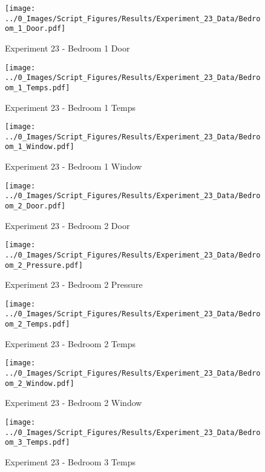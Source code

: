	\begin{figure}[H]
		\centering
		\texttt{[image: ../0\_Images/Script\_Figures/Results/Experiment\_23\_Data/Bedroom\_1\_Door.pdf]}
		\caption[]{Experiment 23 - Bedroom 1 Door}
	\end{figure}
 

	\begin{figure}[H]
		\centering
		\texttt{[image: ../0\_Images/Script\_Figures/Results/Experiment\_23\_Data/Bedroom\_1\_Temps.pdf]}
		\caption[]{Experiment 23 - Bedroom 1 Temps}
	\end{figure}
 
	\clearpage

	\begin{figure}[H]
		\centering
		\texttt{[image: ../0\_Images/Script\_Figures/Results/Experiment\_23\_Data/Bedroom\_1\_Window.pdf]}
		\caption[]{Experiment 23 - Bedroom 1 Window}
	\end{figure}
 

	\begin{figure}[H]
		\centering
		\texttt{[image: ../0\_Images/Script\_Figures/Results/Experiment\_23\_Data/Bedroom\_2\_Door.pdf]}
		\caption[]{Experiment 23 - Bedroom 2 Door}
	\end{figure}
 
	\clearpage

	\begin{figure}[H]
		\centering
		\texttt{[image: ../0\_Images/Script\_Figures/Results/Experiment\_23\_Data/Bedroom\_2\_Pressure.pdf]}
		\caption[]{Experiment 23 - Bedroom 2 Pressure}
	\end{figure}
 

	\begin{figure}[H]
		\centering
		\texttt{[image: ../0\_Images/Script\_Figures/Results/Experiment\_23\_Data/Bedroom\_2\_Temps.pdf]}
		\caption[]{Experiment 23 - Bedroom 2 Temps}
	\end{figure}
 
	\clearpage

	\begin{figure}[H]
		\centering
		\texttt{[image: ../0\_Images/Script\_Figures/Results/Experiment\_23\_Data/Bedroom\_2\_Window.pdf]}
		\caption[]{Experiment 23 - Bedroom 2 Window}
	\end{figure}
 

	\begin{figure}[H]
		\centering
		\texttt{[image: ../0\_Images/Script\_Figures/Results/Experiment\_23\_Data/Bedroom\_3\_Temps.pdf]}
		\caption[]{Experiment 23 - Bedroom 3 Temps}
	\end{figure}
 
